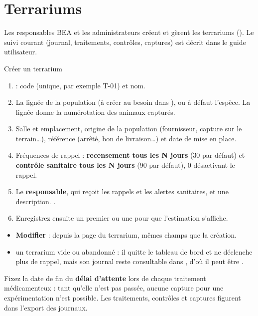 \documentclass[11pt,a4paper]{article}
\begin{document}
\section{Terrariums}\label{sec:terrariums-admin}
Les responsables BEA et les administrateurs créent et gèrent les terrariums
(). Le suivi courant (journal,
traitements, contrôles, captures) est décrit dans le guide utilisateur.

\begin{procedure}{Créer un terrarium}
\begin{enumerate}
  \item {} : code (unique, par exemple T-01) et nom.
  \item La lignée de la population (à créer au besoin dans
    ), ou à défaut l'espèce. La lignée donne la
    numérotation des animaux capturés.
  \item Salle et emplacement, origine de la population (fournisseur,
    capture sur le terrain…), référence (arrêté, bon de livraison…) et date
    de mise en place.
  \item Fréquences de rappel : \textbf{recensement tous les N jours} (30 par
    défaut) et \textbf{contrôle sanitaire tous les N jours} (90 par défaut),
    0 désactivant le rappel.
  \item Le \textbf{responsable}, qui reçoit les rappels et les alertes
    sanitaires, et une description. .
  \item Enregistrez ensuite un premier  ou une
     pour que l'estimation s'affiche.
\end{enumerate}
\end{procedure}
\begin{itemize}
  \item \textbf{Modifier} : depuis la page du terrarium, mêmes champs que la
    création.
  \item {} un terrarium vide ou abandonné : il quitte le tableau
    de bord et ne déclenche plus de rappel, mais son journal reste
    consultable dans , d'où il peut être
    .
\end{itemize}
\begin{regle}
Fixez la date de fin du \textbf{délai d'attente} lors de chaque traitement
médicamenteux : tant qu'elle n'est pas passée, aucune capture pour une
expérimentation n'est possible. Les traitements, contrôles et captures
figurent dans l'export des journaux.
\end{regle}
\end{document}
